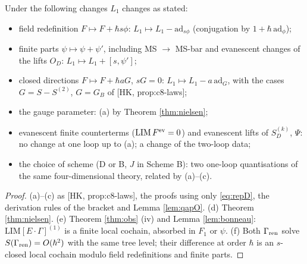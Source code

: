 \begin{proposition}[Laws in DR]
\label{prop:lawsD}
Under the following changes $L_1$ changes as stated:
\begin{itemize}
\item[(a)] field redefinition $F\mapsto F+\hbar s\phi$: $L_1\mapsto L_1-\mathrm{ad}_{s\phi}$ (conjugation by $1+\hbar\,\mathrm{ad}_\phi$);
\item[(b)] finite parts $\psi\mapsto\psi+\psi'$, including MS $\to$ MS-bar and evanescent changes of the lifts $O_D$: $L_1\mapsto L_1+[s,\psi']$;
\item[(c)] closed directions $F\mapsto F+\hbar aG$, $sG=0$: $L_1\mapsto L_1-a\,\mathrm{ad}_G$, with the cases $G=S-S^{(2)}$, $G=G_B$ of [HK, prop:c8-laws];
\item[(d)] the gauge parameter: (a) by Theorem \ref{thm:nielsen};
\item[(e)] evanescent finite counterterms ($\mathrm{LIM}\,F^{\rm ev}=0$) and evanescent lifts of $S^{(k)}_D$, $\Psi$: no change at one loop up to (a); a change of the two-loop data;
\item[(f)] the choice of scheme (D or B, $J$ in Scheme B): two one-loop quantisations of the same four-dimensional theory, related by (a)--(c).
\end{itemize}
\end{proposition}

\begin{proof}
(a)--(c) as [HK, prop:c8-laws], the proofs using only \eqref{eq:repD}, the derivation rules of the bracket and Lemma \ref{lem:qapO}. (d) Theorem \ref{thm:nielsen}. (e) Theorem \ref{thm:obs} (iv) and Lemma \ref{lem:bonneau}: $\mathrm{LIM}[E\cdot\Gamma]^{(1)}$ is a finite local cochain, absorbed in $F_1$ or $\psi$. (f) Both $\Gamma_{\rm ren}$ solve $S(\Gamma_{\rm ren})=O(\hbar^2)$ with the same tree level; their difference at order $\hbar$ is an $s$-closed local cochain modulo field redefinitions and finite parts.
\end{proof}

